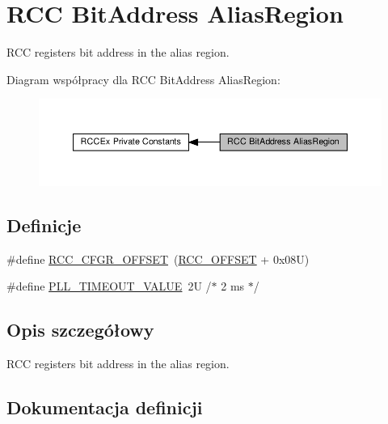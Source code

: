 \hypertarget{group___r_c_c_ex___bit_address___alias_region}{}\section{R\+CC Bit\+Address Alias\+Region}
\label{group___r_c_c_ex___bit_address___alias_region}


R\+CC registers bit address in the alias region.  


Diagram współpracy dla R\+CC Bit\+Address Alias\+Region\+:\nopagebreak
\begin{figure}[H]
\begin{center}
\leavevmode
\includegraphics[width=350pt]{group___r_c_c_ex___bit_address___alias_region}
\end{center}
\end{figure}
\subsection*{Definicje}
\begin{DoxyCompactItemize}
\item 
\#define \hyperlink{group___r_c_c_ex___bit_address___alias_region_gafb1e90a88869585b970749de3c16ce4a}{R\+C\+C\+\_\+\+C\+F\+G\+R\+\_\+\+O\+F\+F\+S\+ET}~(\hyperlink{group___r_c_c___bit_address___alias_region_ga539e07c3b3c55f1f1d47231341fb11e1}{R\+C\+C\+\_\+\+O\+F\+F\+S\+ET} + 0x08\+U)
\item 
\#define \hyperlink{group___r_c_c_ex___bit_address___alias_region_gad54d8ad9b3511329efee38b3ad0665de}{P\+L\+L\+\_\+\+T\+I\+M\+E\+O\+U\+T\+\_\+\+V\+A\+L\+UE}~2\+U  /$\ast$ 2 ms $\ast$/
\end{DoxyCompactItemize}


\subsection{Opis szczegółowy}
R\+CC registers bit address in the alias region. 



\subsection{Dokumentacja definicji}
\mbox{\label{group___r_c_c_ex___bit_address___alias_region_gad54d8ad9b3511329efee38b3ad0665de}} 
